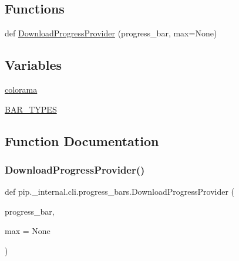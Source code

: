 \subsection*{Functions}
\begin{DoxyCompactItemize}
\item 
def \hyperlink{namespacepip_1_1__internal_1_1cli_1_1progress__bars_aee9848843fbe2f2dbcfc5557c6a24ca5}{Download\+Progress\+Provider} (progress\+\_\+bar, max=None)
\end{DoxyCompactItemize}
\subsection*{Variables}
\begin{DoxyCompactItemize}
\item 
\hyperlink{namespacepip_1_1__internal_1_1cli_1_1progress__bars_a65e416d26909380d6fd08a809ef0c7c3}{colorama}
\item 
\hyperlink{namespacepip_1_1__internal_1_1cli_1_1progress__bars_a8ebb43014bfe3299f9607eb96a21ac35}{B\+A\+R\+\_\+\+T\+Y\+P\+ES}
\end{DoxyCompactItemize}


\subsection{Function Documentation}
\mbox{\label{namespacepip_1_1__internal_1_1cli_1_1progress__bars_aee9848843fbe2f2dbcfc5557c6a24ca5}} 
\subsubsection{\texorpdfstring{Download\+Progress\+Provider()}{DownloadProgressProvider()}}
{\footnotesize\ttfamily def pip.\+\_\+internal.\+cli.\+progress\+\_\+bars.\+Download\+Progress\+Provider (\begin{DoxyParamCaption}\item[{}]{progress\+\_\+bar,  }\item[{}]{max = {\ttfamily None} }\end{DoxyParamCaption})}




